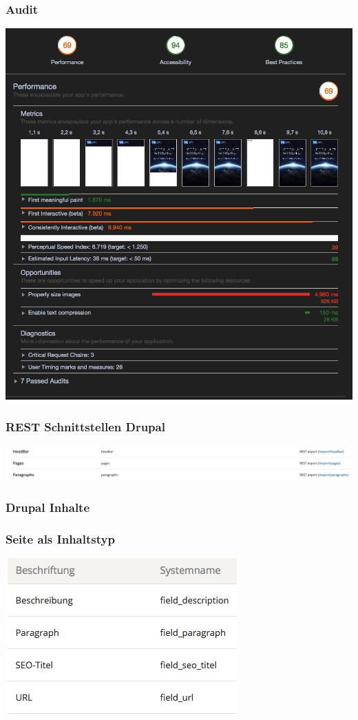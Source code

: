 \documentclass[11pt,a4paper]{article}
\begin{document}
\begin{appendices}
\subsubsection{Audit}
\label{sec:audit}
\includegraphics[scale=0.5]{audit}
\subsubsection{REST Schnittstellen Drupal}
\label{sec:rest}
\includegraphics[width=16cm]{Rest}
\subsubsection{Drupal Inhalte}
\label{sec:content}
\subsubsection*{Seite als Inhaltstyp}
\includegraphics[scale=0.5]{Page}

\end{appendices}
\end{document}
